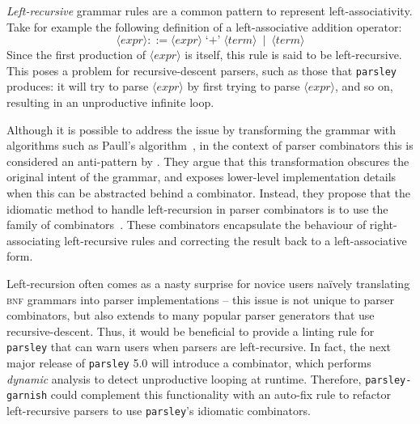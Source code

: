 \documentclass[../../main.tex]{subfiles}
\begin{document}
\label{sec:factor-leftrec}

\emph{Left-recursive} grammar rules are a common pattern to represent left-associativity.
Take for example the following definition of a left-associative addition operator:
\begin{equation*}
\langle \mathit{expr} \rangle ::= \langle \mathit{expr} \rangle \; \text{`+'} \; \langle \mathit{term} \rangle \enspace | \enspace \langle \mathit{term} \rangle
\end{equation*}
%
Since the first production of $\langle \mathit{expr} \rangle$ is itself, this rule is said to be left-recursive.
This poses a problem for recursive-descent parsers, such as those that \texttt{parsley} produces:
it will try to parse $\langle \mathit{expr} \rangle$ by first trying to parse $\langle \mathit{expr} \rangle$, and so on, resulting in an unproductive infinite loop.

Although it is possible to address the issue by transforming the grammar with algorithms such as Paull's algorithm~\cite{moore_removing_2000},
in the context of parser combinators this is considered an anti-pattern by \textcite{willis_design-haskell_2021}.
They argue that this transformation obscures the original intent of the grammar, and exposes lower-level implementation details when this can be abstracted behind a combinator.
Instead, they propose that the idiomatic method to handle left-recursion in parser combinators is to use the  family of combinators~\cite{fokker_functional_1995}.
These combinators encapsulate the behaviour of right-associating left-recursive rules and correcting the result back to a left-associative form.

Left-recursion often comes as a nasty surprise for novice users naïvely translating \textsc{bnf} grammars into parser implementations -- this issue is not unique to parser combinators, but also extends to many popular parser generators that use recursive-descent.
Thus, it would be beneficial to provide a linting rule for \texttt{parsley} that can warn users when parsers are left-recursive.
In fact, the next major release of \texttt{parsley} 5.0 will introduce a  combinator, which performs \emph{dynamic} analysis to detect unproductive looping at runtime.
Therefore, \texttt{parsley-garnish} could complement this functionality with an auto-fix rule to refactor left-recursive parsers to use \texttt{parsley}'s idiomatic  combinators.
\end{document}
